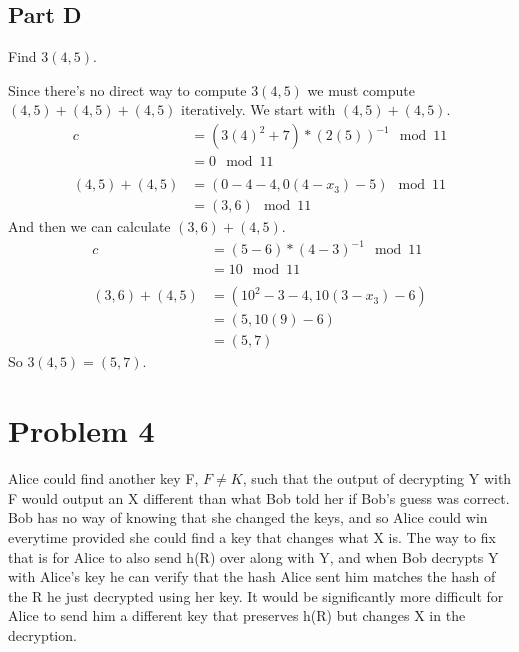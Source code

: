 \documentclass[12pt,letterpaper]{article}
\begin{document}
\subsection{Part D}
\label{sec-3-4}
Find $3(4,5)$.

Since there's no direct way to compute $3(4,5)$ we must compute
$(4,5) + (4,5) + (4,5)$ iteratively. We start with $(4, 5) + (4,5)$. 
\begin{align*}
c &= (3(4)^2 + 7) * (2(5))^{-1} \mod 11 \\
&= 0 \mod 11 \\
\\
(4,5) + (4,5) &= (0 - 4 - 4, 0(4 - x_3) - 5) \mod 11 \\
&= (3, 6) \mod 11
\end{align*}
And then we can calculate $(3, 6) + (4,5)$.
\begin{align*}
c &= (5-6) * (4-3)^{-1} \mod 11 \\
&= 10 \mod 11 \\
\\
(3,6) + (4,5) &= (10^2 - 3 - 4, 10(3 - x_3) - 6) \\
&= (5, 10(9) - 6) \\
&= (5, 7)
\end{align*}
So $3(4,5) = (5,7)$.
\section{Problem 4}
\label{sec-4}
Alice could find another key F, $F \neq K$, such that the output of
decrypting Y with F would output an X different than what Bob told
her if Bob's guess was correct. Bob has no way of knowing that she
changed the keys, and so Alice could win everytime provided she
could find a key that changes what X is. The way to fix that is for
Alice to also send h(R) over along with Y, and when Bob decrypts Y
with Alice's key he can verify that the hash Alice sent him matches
the hash of the R he just decrypted using her key. It would be
significantly more difficult for Alice to send him a different key
that preserves h(R) but changes X in the decryption.
\end{document}
